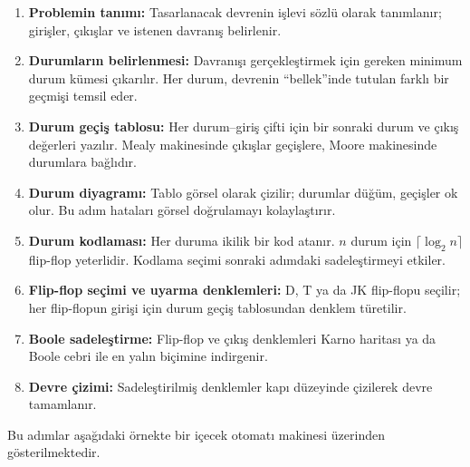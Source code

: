 \begin{enumerate}
  \item \textbf{Problemin tanımı:} Tasarlanacak devrenin işlevi sözlü olarak tanımlanır; girişler, çıkışlar ve istenen davranış belirlenir.
  \item \textbf{Durumların belirlenmesi:} Davranışı gerçekleştirmek için gereken minimum durum kümesi çıkarılır. Her durum, devrenin ``bellek''inde tutulan farklı bir geçmişi temsil eder.
  \item \textbf{Durum geçiş tablosu:} Her durum--giriş çifti için bir sonraki durum ve çıkış değerleri yazılır. Mealy makinesinde çıkışlar geçişlere, Moore makinesinde durumlara bağlıdır.
  \item \textbf{Durum diyagramı:} Tablo görsel olarak çizilir; durumlar düğüm, geçişler ok olur. Bu adım hataları görsel doğrulamayı kolaylaştırır.
  \item \textbf{Durum kodlaması:} Her duruma ikilik bir kod atanır. $n$ durum için $\lceil \log_2 n \rceil$ flip-flop yeterlidir. Kodlama seçimi sonraki adımdaki sadeleştirmeyi etkiler.
  \item \textbf{Flip-flop seçimi ve uyarma denklemleri:} D, T ya da JK flip-flopu seçilir; her flip-flopun girişi için durum geçiş tablosundan denklem türetilir.
  \item \textbf{Boole sadeleştirme:} Flip-flop ve çıkış denklemleri Karno haritası ya da Boole cebri ile en yalın biçimine indirgenir.
  \item \textbf{Devre çizimi:} Sadeleştirilmiş denklemler kapı düzeyinde çizilerek devre tamamlanır.
\end{enumerate}

Bu adımlar aşağıdaki örnekte bir içecek otomatı makinesi üzerinden gösterilmektedir.

